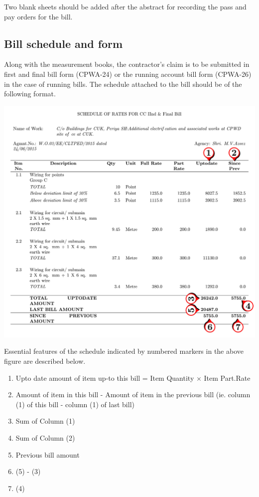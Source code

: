\documentclass[twoside,a4paper]{refart}
\newenvironment{fminipage}[1]%
{\begin{Sbox}\begin{minipage}{#1}\begin{center}}%
		{\end{center}\end{minipage}\end{Sbox}\shadowbox{\TheSbox}}
\newenvironment{noteblock}[1]%
{\begin{mdframed}[topline=false,bottomline=false, rightline=false,
		linewidth=2pt, frametitle={#1}]}%
		{\end{mdframed}}
\begin{document}
	 \begin{noteblock}{Note:}
	 	Two blank sheets should be added after the abstract for recording the pass and pay orders for the bill.
	 \end{noteblock}
	 
	 \subsection{Bill schedule and form}
	 Along with the measurement books, the contractor's claim is to be submitted in first and final bill form (CPWA-24) or the running account bill form (CPWA-26) in the case of running bills. The schedule attached to the bill should be of the following format.
	 
	 \begin{center}
	 	\begin{fminipage}{\textwidth}
	 		\includegraphics[width=1\linewidth]{figures/schedule.pdf}
	 	\end{fminipage}
	 \end{center}
	 
	 Essential features of the schedule indicated by numbered markers in the above figure are described below.
	 
	 \begin{enumerate}
	 	\item Upto date amount of item up-to this bill = Item Quantity $\times$ Item Part.Rate
	 	\item Amount of item in this bill - Amount of item in the previous bill (ie. column (1) of this bill - column (1) of last bill)
	 	\item Sum of Column (1)
	 	\item Sum of Column (2)
	 	\item Previous bill amount
	 	\item (5) - (3)
	 	\item (4) \\
	 \end{enumerate}
	 
\end{document}
